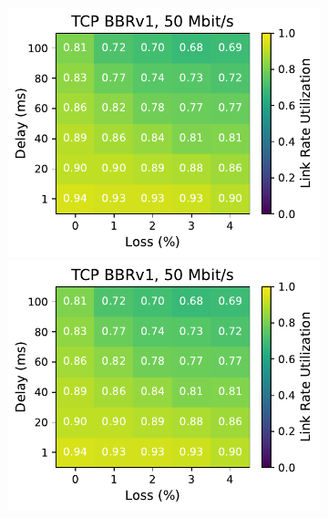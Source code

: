 \begin{figure}[ht]
\begin{subfigure}[b]{1cm}
        \includegraphics[width=\linewidth,trim={8cm 0 0 0},clip]{figures/heatmaps/heatmap_tcp_bbr1_50mbps.pdf}
        \vspace*{0.22cm}
        \includegraphics[width=\linewidth,trim={8cm 0 0 0},clip]{figures/heatmaps/heatmap_tcp_bbr1_50mbps.pdf}
        \vspace*{0.22cm}

\end{subfigure}
\end{figure}
